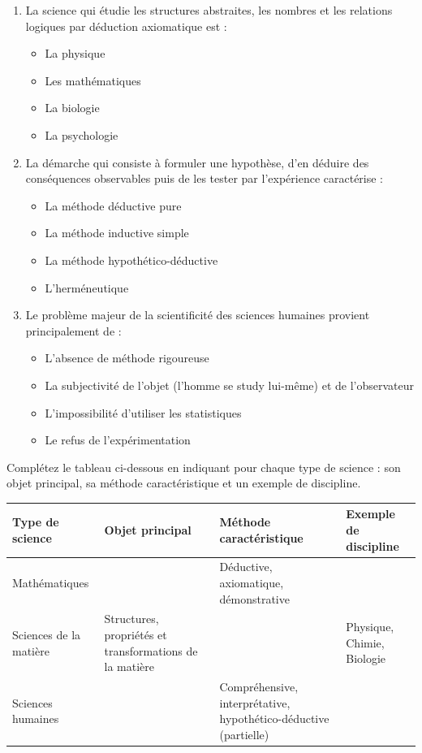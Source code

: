 \documentclass[11pt]{article}
\begin{document}
\begin{exercice}
\begin{enumerate}
    \item La science qui étudie les structures abstraites, les nombres et les relations logiques par déduction axiomatique est :
    \begin{itemize}
        \item[A.] La physique
        \item[B.] Les mathématiques
        \item[C.] La biologie
        \item[D.] La psychologie
    \end{itemize}
    \item La démarche qui consiste à formuler une hypothèse, d'en déduire des conséquences observables puis de les tester par l'expérience caractérise :
    \begin{itemize}
        \item[A.] La méthode déductive pure
        \item[B.] La méthode inductive simple
        \item[C.] La méthode hypothético-déductive
        \item[D.] L'herméneutique
    \end{itemize}
    \item Le problème majeur de la scientificité des sciences humaines provient principalement de :
    \begin{itemize}
        \item[A.] L'absence de méthode rigoureuse
        \item[B.] La subjectivité de l'objet (l'homme se study lui-même) et de l'observateur
        \item[C.] L'impossibilité d'utiliser les statistiques
        \item[D.] Le refus de l'expérimentation
    \end{itemize}
\end{enumerate}
\end{exercice}

\begin{exercice}
Complétez le tableau ci-dessous en indiquant pour chaque type de science : son objet principal, sa méthode caractéristique et un exemple de discipline.

\begin{tabular}{|p{2.5cm}|p{4cm}|p{4cm}|p{3cm}|}
\hline
\textbf{Type de science} & \textbf{Objet principal} & \textbf{Méthode caractéristique} & \textbf{Exemple de discipline} \\
\hline
Mathématiques &  & Déductive, axiomatique, démonstrative &  \\
\hline
Sciences de la matière & Structures, propriétés et transformations de la matière &  & Physique, Chimie, Biologie \\
\hline
Sciences humaines &  & Compréhensive, interprétative, hypothético-déductive (partielle) &  \\
\hline
\end{tabular}
\end{exercice}
\end{document}
